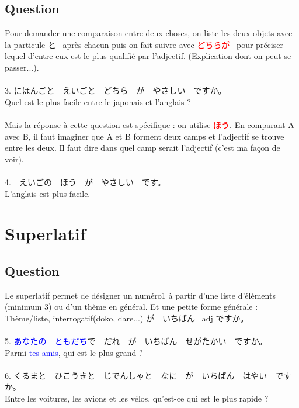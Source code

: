 \documentclass[11pt]{report}
\newenvironment{Japanese}{%
\CJKfamily{min}%
\CJKtilde  
\CJKnospace}{}
\begin{document}
\subsection{Question}

\begin{CJK}{UTF8}{}  
\begin{Japanese}
	Pour demander une comparaison entre deux choses, on liste les deux objets avec la particule と \, après chacun puis on fait suivre avec \textcolor{red}{どちらが} \, pour préciser lequel d'entre eux est le plus qualifi\'e par l'adjectif. (Explication dont on peut se passer...). \\ \\
	3. にほんごと　えいごと　どちら　が　やさしい　ですか。 \\
	Quel est le plus facile entre le japonais et l'anglais ? \\ 
	\\
	Mais la réponse \`a cette question est spécifique : on utilise \textcolor{red}{ほう}. En comparant A avec B, il faut imaginer que A et B forment deux camps et l'adjectif se trouve entre les deux. Il faut dire dans quel camp serait l'adjectif (c'est ma façon de voir). \\
	\\
	4.　えいごの　ほう　が　やさしい　です。 \\
	L'anglais est plus facile.
\end{Japanese}  
\end{CJK}

\section{Superlatif}

\subsection{Question}

\begin{CJK}{UTF8}{}  
\begin{Japanese}
	Le superlatif permet de désigner un numéro1 \`a partir d'une liste d'éléments (minimum 3) ou d'un thème en général. Et une petite forme générale : \\
	Thème/liste, interrogatif(doko, dare...) が　いちばん \, adj ですか。 \\ \\
	5. \textcolor{blue}{あなたの　ともだち}で　だれ　が　いちばん　\underline{せがたかい}　ですか。 \\
	Parmi \textcolor{blue}{tes amis}, qui est le plus \underline{grand} ? \\ \\
	6. くるまと　ひこうきと　じでんしゃと　なに　が　いちばん　はやい　ですか。 \\
	Entre les voitures, les avions et les vélos, qu'est-ce qui est le plus rapide ?
	
\end{Japanese}  
\end{CJK}
\end{document}
